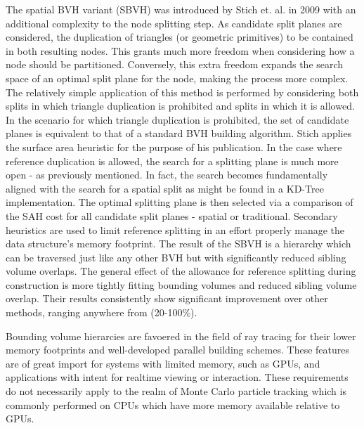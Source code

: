 The spatial BVH variant (SBVH) was introduced by Stich et. al. in 2009
\cite{Stich_2009} with an additional complexity to the node splitting step. As
candidate split planes are considered, the duplication of triangles (or
geometric primitives) to be contained in both resulting nodes. This grants much
more freedom when considering how a node should be partitioned. Conversely, this
extra freedom expands the search space of an optimal split plane for the node,
making the process more complex. The relatively simple application of this
method is performed by considering both splits in which triangle duplication is
prohibited and splits in which it is allowed. In the scenario for which triangle
duplication is prohibited, the set of candidate planes is equivalent to that of
a standard BVH building algorithm. Stich applies the surface area heuristic for
the purpose of his publication. In the case where reference duplication is
allowed, the search for a splitting plane is much more open - as previously
mentioned. In fact, the search becomes fundamentally aligned with the search for
a spatial split as might be found in a KD-Tree implementation. The optimal
splitting plane is then selected via a comparison of the SAH cost for all
candidate split planes - spatial or traditional. Secondary heuristics are used
to limit reference splitting in an effort properly manage the data structure's
memory footprint. The result of the SBVH is a hierarchy which can be traversed
just like any other BVH but with significantly reduced sibling volume
overlaps. The general effect of the allowance for reference splitting during
construction is more tightly fitting bounding volumes and reduced sibling volume
overlap. Their results consistently show significant improvement over other
methods, ranging anywhere from (20-100\%).\cite{Stich_2009}

Bounding volume hierarcies are favoered in the field of ray tracing for their
lower memory footprints and well-developed parallel building schemes. These
features are of great import for systems with limited memory, such as GPUs, and
applications with intent for realtime viewing or interaction. These requirements
do not necessarily apply to the realm of Monte Carlo particle tracking which is
commonly performed on CPUs which have more memory available relative to GPUs.



